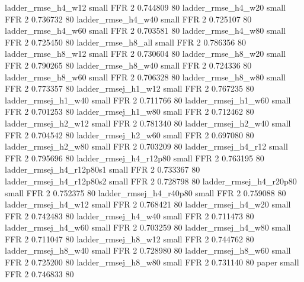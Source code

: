       ladder_rmse_h4_w12      small      FFR                 2 0.744809 80
      ladder_rmse_h4_w20      small      FFR                 2 0.736732 80
      ladder_rmse_h4_w40      small      FFR                 2 0.725107 80
      ladder_rmse_h4_w60      small      FFR                 2 0.703581 80
      ladder_rmse_h4_w80      small      FFR                 2 0.725450 80
      ladder_rmse_h8_all      small      FFR                 2 0.786356 80
      ladder_rmse_h8_w12      small      FFR                 2 0.730604 80
      ladder_rmse_h8_w20      small      FFR                 2 0.790265 80
      ladder_rmse_h8_w40      small      FFR                 2 0.724336 80
      ladder_rmse_h8_w60      small      FFR                 2 0.706328 80
      ladder_rmse_h8_w80      small      FFR                 2 0.773357 80
     ladder_rmsej_h1_w12      small      FFR                 2 0.767235 80
     ladder_rmsej_h1_w40      small      FFR                 2 0.711766 80
     ladder_rmsej_h1_w60      small      FFR                 2 0.701253 80
     ladder_rmsej_h1_w80      small      FFR                 2 0.712462 80
     ladder_rmsej_h2_w12      small      FFR                 2 0.781340 80
     ladder_rmsej_h2_w40      small      FFR                 2 0.704542 80
     ladder_rmsej_h2_w60      small      FFR                 2 0.697080 80
     ladder_rmsej_h2_w80      small      FFR                 2 0.703209 80
     ladder_rmsej_h4_r12      small      FFR                 2 0.795696 80
  ladder_rmsej_h4_r12p80      small      FFR                 2 0.763195 80
ladder_rmsej_h4_r12p80s1      small      FFR                 2 0.733367 80
ladder_rmsej_h4_r12p80s2      small      FFR                 2 0.728798 80
  ladder_rmsej_h4_r20p80      small      FFR                 2 0.752375 80
  ladder_rmsej_h4_r40p80      small      FFR                 2 0.759088 80
     ladder_rmsej_h4_w12      small      FFR                 2 0.768421 80
     ladder_rmsej_h4_w20      small      FFR                 2 0.742483 80
     ladder_rmsej_h4_w40      small      FFR                 2 0.711473 80
     ladder_rmsej_h4_w60      small      FFR                 2 0.703259 80
     ladder_rmsej_h4_w80      small      FFR                 2 0.711047 80
     ladder_rmsej_h8_w12      small      FFR                 2 0.744762 80
     ladder_rmsej_h8_w40      small      FFR                 2 0.728980 80
     ladder_rmsej_h8_w60      small      FFR                 2 0.725200 80
     ladder_rmsej_h8_w80      small      FFR                 2 0.731140 80
                   paper      small      FFR                 2 0.746833 80
